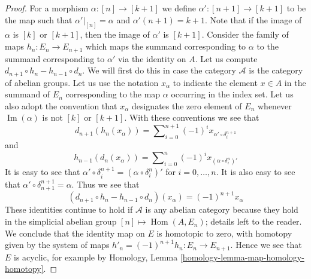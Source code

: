 \documentclass{stacks-project}
\theoremstyle{plain}
\theoremstyle{definition}
\theoremstyle{remark}
\numberwithin{equation}{subsection}
\def\Hom{\mathop{\mathrm{Hom}}\nolimits}
\def\Im{\mathop{\mathrm{Im}}}
\begin{document}
\begin{proof}
For a morphism $\alpha : [n] \to [k + 1]$
we define $\alpha' : [n + 1] \to [k + 1]$ to be
the map such that $\alpha'|_{[n]} = \alpha$ and
$\alpha'(n + 1) = k + 1$. Note that if the
image of $\alpha$ is $[k]$ or $[k + 1]$, then
the image of $\alpha'$ is $[k + 1]$.
Consider the family of
maps $h_n : E_n \to E_{n + 1}$ which maps
the summand corresponding to $\alpha$ to
the summand corresponding to $\alpha'$ via
the identity on $A$.
Let us compute $d_{n + 1} \circ h_n - h_{n - 1} \circ d_n$.
We will first do this in case the category $\mathcal{A}$ is
the category of abelian groups.
Let us use the notation $x_\alpha$ to indicate
the element $x \in A$ in the summand of $E_n$ corresponding
to the map $\alpha$ occurring in the index set.
Let us also adopt the convention that
$x_\alpha$ designates the zero element of $E_n$
whenever $\Im(\alpha)$ is not $[k]$ or $[k + 1]$.
With these conventions we see that
$$
d_{n + 1}(h_n(x_\alpha)) =
\sum\nolimits_{i = 0}^{n + 1} (-1)^i x_{\alpha' \circ \delta^{n + 1}_i}
$$
and
$$
h_{n - 1}(d_n(x_\alpha)) =
\sum\nolimits_{i = 0}^n (-1)^i x_{(\alpha \circ \delta_i^n)'}
$$
It is easy to see that
$\alpha' \circ \delta^{n + 1}_i = (\alpha \circ \delta_i^n)'$
for $i = 0, \ldots, n$. It is also easy to see that
$\alpha' \circ \delta^{n + 1}_{n + 1} = \alpha$. Thus we
see that
$$
(d_{n + 1} \circ h_n - h_{n - 1} \circ d_n)(x_\alpha)
=
(-1)^{n + 1} x_\alpha
$$
These identities continue to hold if $\mathcal{A}$ is any abelian
category because they hold in the simplicial abelian group
$[n] \mapsto \Hom(A, E_n)$; details left to the reader.
We conclude that the identity map on $E$ is
homotopic to zero, with homotopy given by the
system of maps $h'_n = (-1)^{n + 1}h_n : E_n \to E_{n + 1}$.
Hence we see that $E$ is acyclic, for
example by Homology, Lemma \ref{homology-lemma-map-homology-homotopy}.
\end{proof}
\end{document}
